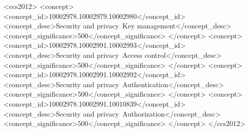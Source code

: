 \begin{abstract}
  Modern security relies heavily on public key cryptography,
  and private keys and secrets in general must be protected from attackers.
  Against a highly-capable adversary it is ideal to store secrets outside of main memory,
  which is easy on general purpose systems with the now widely-available Trusted Platform Module (TPM) 2.0.
  However, the lack of integration between the TPM and the OS makes protecting secrets with automated availability needs difficult.
  We develop a strategy to authenticate OS entities and protect TPM-stored secrets
  without restricting access to the TPM,
  using standard features available on Linux---SELinux, Integrity Measurement Architecture (IMA), Extended Verification Module (EVM), and Linux Unified Key Setup (LUKS).

  \iflncs{}\fi
\end{abstract}

\ifacm
\begin{CCSXML}
<ccs2012>
<concept>
<concept_id>10002978.10002979.10002980</concept_id>
<concept_desc>Security and privacy~Key management</concept_desc>
<concept_significance>500</concept_significance>
</concept>
<concept>
<concept_id>10002978.10002991.10002993</concept_id>
<concept_desc>Security and privacy~Access control</concept_desc>
<concept_significance>500</concept_significance>
</concept>
<concept>
<concept_id>10002978.10002991.10002992</concept_id>
<concept_desc>Security and privacy~Authentication</concept_desc>
<concept_significance>500</concept_significance>
</concept>
<concept>
<concept_id>10002978.10002991.10010839</concept_id>
<concept_desc>Security and privacy~Authorization</concept_desc>
<concept_significance>500</concept_significance>
</concept>
</ccs2012>
\end{CCSXML}


\fi

